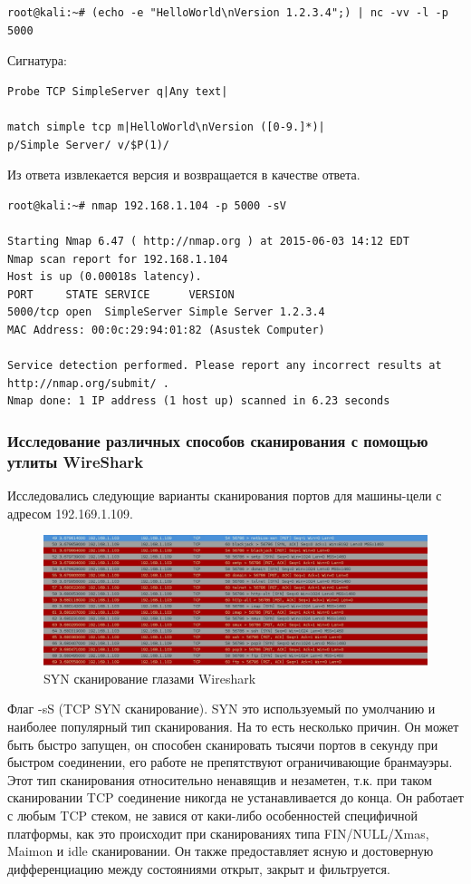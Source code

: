 \documentclass[10pt,a4paper]{article}
\begin{document}
\begin{verbatim}
root@kali:~# (echo -e "HelloWorld\nVersion 1.2.3.4";) | nc -vv -l -p 5000
\end{verbatim}

Сигнатура: 

\begin{verbatim}
Probe TCP SimpleServer q|Any text|

match simple tcp m|HelloWorld\nVersion ([0-9.]*)|
p/Simple Server/ v/$P(1)/
\end{verbatim}

Из ответа извлекается версия и возвращается в качестве ответа.

\begin{lstlisting}
root@kali:~# nmap 192.168.1.104 -p 5000 -sV

Starting Nmap 6.47 ( http://nmap.org ) at 2015-06-03 14:12 EDT
Nmap scan report for 192.168.1.104
Host is up (0.00018s latency).
PORT     STATE SERVICE      VERSION
5000/tcp open  SimpleServer Simple Server 1.2.3.4
MAC Address: 00:0c:29:94:01:82 (Asustek Computer)

Service detection performed. Please report any incorrect results at 
http://nmap.org/submit/ .
Nmap done: 1 IP address (1 host up) scanned in 6.23 seconds
\end{lstlisting}

\subsubsection{Исследование различных способов сканирования с помощью утлиты WireShark}

Исследовались следующие варианты сканирования портов для машины-цели с адресом 192.169.1.109.

\begin{figure}[h!]
\centering
\includegraphics[scale=0.4]{wireshark_syn.JPG}
\caption{SYN сканирование глазами Wireshark}
\end{figure}

Флаг -sS (TCP SYN сканирование).
SYN это используемый по умолчанию и наиболее популярный тип сканирования. На то есть несколько причин. Он может быть быстро запущен, он способен сканировать тысячи портов в секунду при быстром соединении, его работе не препятствуют ограничивающие бранмауэры. Этот тип сканирования относительно ненавящив и незаметен, т.к. при таком сканировании TCP соединение никогда не устанавливается до конца. Он работает с любым TCP стеком, не завися от каки-либо особенностей специфичной платформы, как это происходит при сканированиях типа FIN/NULL/Xmas, Maimon и idle сканировании. Он также предоставляет ясную и достоверную дифференциацию между состояниями открыт, закрыт и фильтруется.
\end{document}
